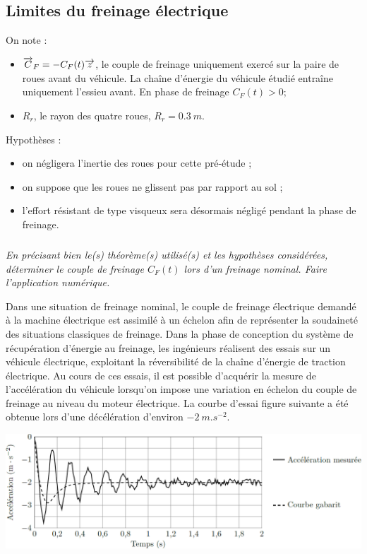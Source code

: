 \documentclass[10pt,fleqn]{article} %
\begin{document}
\begin{multicols}{2}
\subsection*{Limites du freinage électrique}
On note :
\begin{itemize}
\item $\overrightarrow{C}_F = -C_F (t)\overrightarrow{z}$, le couple de freinage uniquement exercé sur la paire de roues avant du véhicule. La chaîne d’énergie du véhicule étudié entraîne uniquement l’essieu avant. En phase de freinage $C_F (t) > 0$;
\item $R_r$, le rayon des quatre roues, $R_r = \SI{0,3}{m}$.
\end{itemize}
Hypothèses :
\begin{itemize}
\item on négligera l’inertie des roues pour cette pré-étude ;
\item on suppose que les roues ne glissent pas par rapport au sol ;
\item l’effort résistant de type visqueux sera désormais négligé pendant la phase de freinage.
\end{itemize}


\subparagraph{}\textit{En précisant bien le(s) théorème(s) utilisé(s) et les hypothèses considérées, déterminer le couple de freinage $C_F (t)$ lors d’un freinage nominal. Faire l’application numérique.}
\ifprof
\begin{corrige}
\end{corrige}
\else
\fi


Dans une situation de freinage nominal, le couple de freinage électrique demandé à la machine électrique est
assimilé à un échelon afin de représenter la soudaineté des situations classiques de freinage.
Dans la phase de conception du système de récupération d’énergie au freinage, les ingénieurs réalisent des essais
sur un véhicule électrique, exploitant la réversibilité de la chaîne d’énergie de traction électrique. Au cours de
ces essais, il est possible d’acquérir la mesure de l’accélération du véhicule lorsqu’on impose une variation en
échelon du couple de freinage au niveau du moteur électrique. La courbe d’essai figure suivante a été obtenue lors
d’une décélération d’environ $\SI{-2}{m.s^{-2}}$.



\begin{center}
\includegraphics[width=\linewidth]{images/fig_03}


\end{center}
\end{multicols}
\end{document}
